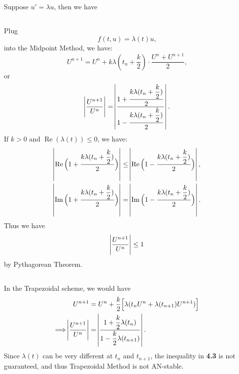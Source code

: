 \documentclass[11pt]{article}
\begin{document}
\subsection{}
Suppose $u'=\lambda u$, then we have

\subsection{}
Plug
\begin{equation}
    f(t, u) = \lambda(t)u,
\nonumber\end{equation}
into the Midpoint Method, we have:
\begin{equation}
    U^{n+1} = U^n + k\lambda(t_n + \dfrac k2)\cdot\dfrac{U^n+U^{n+1}}2,
\nonumber\end{equation}
or
\begin{equation}
    \abs{\dfrac{U^{n+1}}{U^n}} =
    \abs{\dfrac{1+\dfrac{k\lambda(t_n+\dfrac k2)}2}{1-\dfrac{k\lambda(t_n+\dfrac k2)}2}}.
\end{equation}
If $k>0$ and $\operatorname{Re}(\lambda(t)) \leq 0$, we have:
\begin{equation}\begin{split}
    \abs{\operatorname{Re}\Big(1+\dfrac{k\lambda(t_n+\dfrac k2)}2\Big)}
    &\leq\abs{\operatorname{Re}\Big(1-\dfrac{k\lambda(t_n+\dfrac k2)}2\Big)},\\
    \abs{\operatorname{Im}\Big(1+\dfrac{k\lambda(t_n+\dfrac k2)}2\Big)}
    &=\abs{\operatorname{Im}\Big(1-\dfrac{k\lambda(t_n+\dfrac k2)}2\Big)}.
\end{split}\end{equation}
Thus we have
\begin{equation}
    \abs{\dfrac{U^{n+1}}{U^n}} \leq 1
\end{equation}
by Pythagorean Theorem.

\subsection{}
In the Trapezoidal scheme, we would have 
\begin{equation}\begin{split}
    U^{n+1} &= U^n + \dfrac k2 \Big[ \lambda(t_nU^n + \lambda(t_{n+1})U^{n+1})\Big]\\
    \Longrightarrow
    \abs{\dfrac{U^{n+1}}{U^n}} &= \abs{\dfrac{1+\dfrac k2\lambda(t_n)}
        {1-\dfrac k2 \lambda(t_{n+1})}}.
\end{split}\end{equation}
Since $\lambda(t)$ can be very different at $t_n$ and $t_{n+1}$, 
the inequality in \textbf{4.3} is not guaranteed, and thus Trapezoidal Method is not AN-stable.
\end{document}
